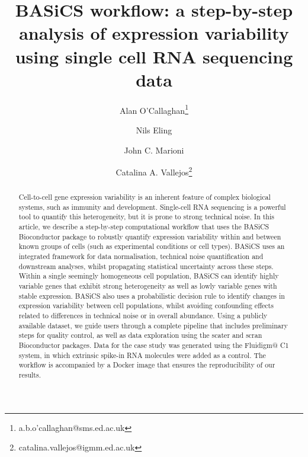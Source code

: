 \documentclass[9pt,a4paper,]{extarticle}
\begin{document}
\pagestyle{front}

\title{BASiCS workflow: a step-by-step analysis of expression variability using single cell RNA sequencing data}

\author[1]{Alan O'Callaghan\thanks{\ttfamily a.b.o'callaghan@sms.ed.ac.uk}}
\author[2]{Nils Eling}
\author[3,4]{John C. Marioni}
\author[1,5]{Catalina A. Vallejos\thanks{\ttfamily catalina.vallejos@igmm.ed.ac.uk}}

\maketitle
\thispagestyle{front}

\begin{abstract}
Cell-to-cell gene expression variability is an inherent feature of complex
biological systems, such as immunity and development. Single-cell RNA
sequencing is a powerful tool to quantify this heterogeneity, but it is prone
to strong technical noise. In this article, we describe a step-by-step
computational workflow that uses the BASiCS Bioconductor package to robustly
quantify expression variability within and between known groups of cells (such
as experimental conditions or cell types). BASiCS uses an integrated framework
for data normalisation, technical noise quantification and downstream
analyses, whilst propagating statistical uncertainty across these steps.
Within a single seemingly homogeneous cell population, BASiCS can identify
highly variable genes that exhibit strong heterogeneity as well as lowly
variable genes with stable expression. BASiCS also uses a probabilistic
decision rule to identify changes in expression variability between cell
populations, whilst avoiding confounding effects related to differences in
technical noise or in overall abundance. Using a publicly available
dataset, we guide users through a complete pipeline that includes
preliminary steps for quality control, as well as data exploration
using the scater and scran Bioconductor packages. Data for the case
study was generated using the Fluidigm@ C1 system, in which extrinsic
spike-in RNA molecules were added as a control. The workflow is accompanied
by a Docker image that ensures the reproducibility of our results.
\end{abstract}
\end{document}
